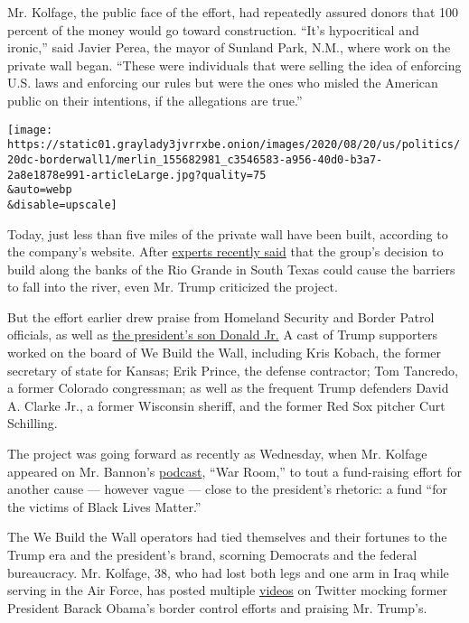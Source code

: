 Mr. Kolfage, the public face of the effort, had repeatedly assured
donors that 100 percent of the money would go toward construction.
``It's hypocritical and ironic,'' said Javier Perea, the mayor of
Sunland Park, N.M., where work on the private wall began. ``These were
individuals that were selling the idea of enforcing U.S. laws and
enforcing our rules but were the ones who misled the American public on
their intentions, if the allegations are true.''

\texttt{[image: https://static01.graylady3jvrrxbe.onion/images/2020/08/20/us/politics/20dc-borderwall1/merlin\_155682981\_c3546583-a956-40d0-b3a7-2a8e1878e991-articleLarge.jpg?quality=75\\\&auto=webp\\\&disable=upscale]}

Today, just less than five miles of the private wall have been built,
according to the company's website. After
\href{https://www.propublica.org/article/he-built-a-privately-funded-border-wall-its-already-at-risk-of-falling-down-if-not-fixed}{experts
recently said} that the group's decision to build along the banks of the
Rio Grande in South Texas could cause the barriers to fall into the
river, even Mr. Trump criticized the project.

But the effort earlier drew praise from Homeland Security and Border
Patrol officials, as well as
\href{https://twitter.com/KFILE/status/1296470804058832899?s=20}{the
president's son Donald Jr.} A cast of Trump supporters worked on the
board of We Build the Wall, including Kris Kobach, the former secretary
of state for Kansas; Erik Prince, the defense contractor; Tom Tancredo,
a former Colorado congressman; as well as the frequent Trump defenders
David A. Clarke Jr., a former Wisconsin sheriff, and the former Red Sox
pitcher Curt Schilling.

The project was going forward as recently as Wednesday, when Mr. Kolfage
appeared on Mr. Bannon's
\href{https://pandemic.warroom.org/2020/08/19/ep-342-pandemic-the-unraveling-of-america-w-brian-kolfage-brandon-judd-the-embed-and-wade-davis/}{podcast},
``War Room,'' to tout a fund-raising effort for another cause ---
however vague --- close to the president's rhetoric: a fund ``for the
victims of Black Lives Matter.''

The We Build the Wall operators had tied themselves and their fortunes
to the Trump era and the president's brand, scorning Democrats and the
federal bureaucracy. Mr. Kolfage, 38, who had lost both legs and one arm
in Iraq while serving in the Air Force, has posted multiple
\href{https://twitter.com/BrianKolfage/status/1167114949476388865}{videos}
on Twitter mocking former President Barack Obama's border control
efforts and praising Mr. Trump's.


